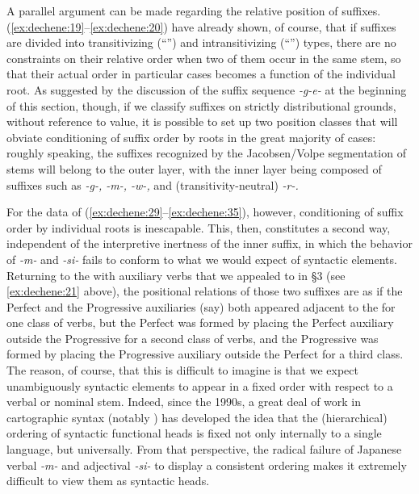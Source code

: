 \documentclass[output=paper,
modfonts
]{LSP/langsci}
\begin{document}
A parallel argument can be made regarding the relative position of
suffixes. (\ref{ex:dechene:19}--\ref{ex:dechene:20}) have already shown, of course, that if suffixes are
divided into transitivizing (``'') and intransitivizing
(``'') types, there are no constraints on their relative order
when two of them occur in the same stem, so that their actual order in
particular cases becomes a function of the individual root. As suggested
by the discussion of the suffix sequence \textit{-g-e-} at the beginning
of this section, though, if we classify suffixes on strictly
distributional grounds, without reference to  value, it is
possible to set up two position classes that will obviate conditioning
of suffix order by roots in the great majority of cases: roughly
speaking, the suffixes recognized by the Jacobsen/Volpe segmentation of
stems will belong to the outer layer, with the inner layer being
composed of suffixes such as \textit{-g-, -m-, -w-,} and
(transitivity-neutral) \textit{-r-.}

For the data of (\ref{ex:dechene:29}--\ref{ex:dechene:35}), however, conditioning of suffix order by
individual roots is inescapable. This, then, constitutes a second way,
independent of the interpretive inertness of the inner suffix, in which
the behavior of \textit{-m-} and \textit{-si-} fails to conform to what we
would expect of syntactic elements. Returning to the  with
auxiliary verbs that we appealed to in \S3 (see \ref{ex:dechene:21} above), the
positional relations of those two suffixes are as if the Perfect and the
Progressive auxiliaries (say) both appeared adjacent to the  for one
class of verbs, but the Perfect was formed by placing the Perfect
auxiliary outside the Progressive for a second class of verbs, and the
Progressive was formed by placing the Progressive auxiliary outside the
Perfect for a third class. The reason, of course, that this is difficult
to imagine is that we expect unambiguously syntactic elements to appear
in a fixed order with respect to a verbal or nominal stem. Indeed, since
the 1990s, a great deal of work in cartographic syntax (notably \citealt{cinque1999a}) has developed the idea that the (hierarchical) ordering of
syntactic functional heads is fixed not only internally to a single
language, but universally. From that perspective, the radical failure of
Japanese verbal \textit{-m-} and adjectival \textit{-si-} to display a
consistent ordering makes it extremely difficult to view them as
syntactic heads.
\end{document}
